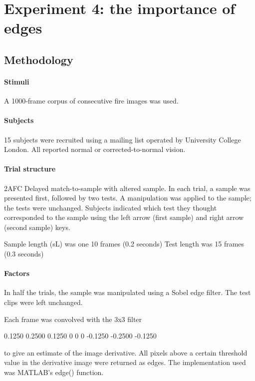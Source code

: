 \section{Experiment 4: the importance of edges}

\subsection{Methodology}

\paragraph{Stimuli}

A 1000-frame corpus of consecutive fire images was used.

\paragraph{Subjects}

15 subjects were recruited using a mailing list operated by University College London. All reported normal or corrected-to-normal vision.

\paragraph{Trial structure}

2AFC Delayed match-to-sample with altered sample.
In each trial, a sample was presented first, followed by two tests. A manipulation was applied to the sample; the tests were unchanged. Subjects indicated which test they thought corresponded to the sample using the left arrow (first sample) and right arrow (second sample) keys. 

Sample length (sL) was one 10 frames (0.2 seconds)
Test length was 15 frames (0.3 seconds)

\paragraph{Factors}

In half the trials, the sample was manipulated using a Sobel edge filter. The test clips were left unchanged.

Each frame was convolved with the 3x3 filter

    0.1250    0.2500    0.1250
         0         0         0
   -0.1250   -0.2500   -0.1250

to give an estimate of the image derivative. All pixels above a certain threshold value in the derivative image were returned as edges. The implementation used was MATLAB's edge() function.


